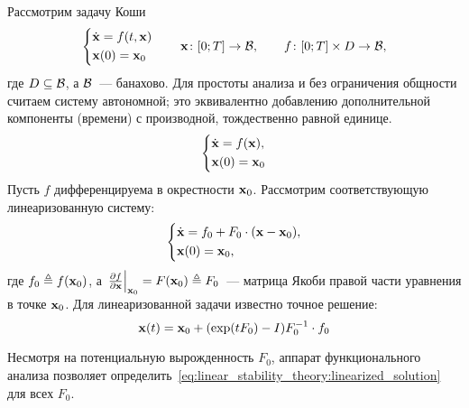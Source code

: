 Рассмотрим задачу Коши
\begin{equation}
    \label{eq:linear_stability_theory:initial_value_problem}
    \begin{dcases}
        \dot{\mathbf{x}} = f(t, \mathbf{x}) \\
        \mathbf{x}(0) = \mathbf{x}_0
    \end{dcases}
    \qquad
    \mathbf{x} \colon [0; T] \to \mathcal{B}, \qquad f \colon [0;T] \times D \to \mathcal{B},
\end{equation}
%
где $ D \subseteq \mathcal{B} $,
а $ \mathcal{B} $~--- банахово.
Для простоты анализа и без ограничения общности считаем систему автономной;
это эквивалентно добавлению дополнительной компоненты (времени) с производной,
тождественно равной единице.
%
\begin{equation}
    \label{eq:linear_stability_theory:autonomous_initial_value_problem}
    \begin{dcases}
        \dot{\mathbf{x}} = f(\mathbf{x}), \\
        \mathbf{x}(0) = \mathbf{x}_0
    \end{dcases}
\end{equation}
%
Пусть $ f $ дифференцируема в окрестности $ \mathbf{x}_0 $.
Рассмотрим соответствующую линеаризованную систему:
%
\begin{equation}
    \label{eq:linear_stability_theory:linearized_initial_value_problem}
    \begin{dcases}
        \dot{\mathbf{x}} = f_0 + F_0 \cdot (\mathbf{x} - \mathbf{x}_0), \\
        \mathbf{x}(0) = \mathbf{x}_0,
    \end{dcases}
\end{equation}
%
где $ f_0 \triangleq f(\mathbf{x}_0)$,
а $ \left. \frac{\partial f}{\partial \mathbf{x}} \right|_{\mathbf{x}_0} = F(\mathbf{x}_0) \triangleq F_0 $~---
матрица Якоби правой части уравнения в точке $ \mathbf{x}_0 $.
Для линеаризованной задачи известно точное решение:
\begin{equation}
    \label{eq:linear_stability_theory:linearized_solution}
    \mathbf{x}(t) = \mathbf{x}_0 + (\exp(t F_0) - I) F_0^{-1} \cdot f_0
\end{equation}

Несмотря на потенциальную вырожденность $ F_0 $,
аппарат функционального анализа позволяет определить~\eqref{eq:linear_stability_theory:linearized_solution}
для всех $ F_0 $.

